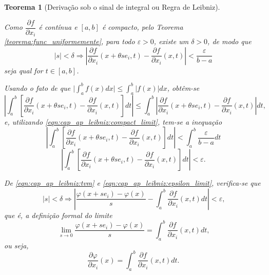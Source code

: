 \documentclass[
	12pt,				%
	openright,			%
    twoside,			%
	a4paper,			%
	chapter=TITLE,		%
	english,			%
	french,				%
	spanish,			%
	brazil				%
	]{abntex2}
\makeatletter
\newtheorem{teorema}{Teorema}
\renewenvironment{proof}[1][\proofname]{
	\par\pushQED{\qed}%
	\normalfont \topsep6\p@\@plus6\p@\relax
	\trivlist
	\item\relax
		{\itshape
			#1\@addpunct{.}}\hspace\labelsep\ignorespaces
}{%
	\popQED\endtrivlist\@endpefalse
}
\numberwithin{lema}{chapter}
\numberwithin{teorema}{chapter}
\numberwithin{definicao}{chapter}
\numberwithin{exemplo}{chapter}
\numberwithin{figure}{chapter}
\makeatother
\begin{document}
\begin{apendicesenv}
{\begin{teorema}[Derivação sob o sinal de integral ou Regra de Leibniz]
\begin{proof}
			Como $\dfrac{\partial f}{\partial x_i}$ é contínua e $[a,b]$ é compacto, pelo Teorema \ref{teorema:func_uniformemente}, para todo $\varepsilon > 0$, existe um $\delta > 0$, de modo que
			\begin{equation}
				\label{eqn:cap_ap_leibniz:compact_limit}
				|s|<\delta \Longrightarrow
				\left | 
					\frac{\partial f}{\partial x_i} (x+\theta s e_i, t) - \frac{\partial f}{\partial x_i}(x,t)
				\right | < \frac{\varepsilon}{b-a}
			\end{equation}
			seja qual for $t \in [a,b]$.
			
			Usando o fato de que $\displaystyle \Big |\int_a^b f(x)dx \Big | \leqslant \int_a^b |f(x)| dx$, obtêm-se
			$$
			\left |
				\int_a^b \left [
					\frac{\partial f}{\partial x_i}(x+\theta s e_i, t)-\frac{\partial f}{\partial x_i}(x,t)
				\right ] dt
			\right |
			\leqslant
			\int_a^b\left |
				\frac{\partial f}{\partial x_i}(x+\theta s e_i, t)-\frac{\partial f}{\partial x_i}(x,t)
			\right | dt\text{,}
			$$
			e, utilizando \eqref{eqn:cap_ap_leibniz:compact_limit}, tem-se a inequação
			$$
			\left |
				\int_a^b \left [
					\frac{\partial f}{\partial x_i}(x+\theta s e_i, t)-\frac{\partial f}{\partial x_i}(x,t)
				\right ] dt
			\right |
			<
			\int_a^b \frac{\varepsilon}{b-a} dt
			$$
			\begin{equation}
				\label{eqn:cap_ap_leibniz:epsilon_limit}
				\left |
					\int_a^b \left [
						\frac{\partial f}{\partial x_i}(x+\theta s e_i, t)-\frac{\partial f}{\partial x_i}(x,t)
					\right ] dt
				\right |
				< \varepsilon \text{.}
			\end{equation}
			
			De \eqref{eqn:cap_ap_leibniz:tvm} e \eqref{eqn:cap_ap_leibniz:epsilon_limit}, verifica-se que
			$$
				|s|<\delta \Longrightarrow
				\left |
					\frac{\varphi(x+se_i)-\varphi(x)}{s}
					- \int_a^b \frac{\partial f}{\partial x_i}(x,t) dt
				\right |
				< \varepsilon\text{,}
			$$
			que é, a definição formal do limite
			$$
				 \lim_{s\to 0} \frac{\varphi (x+se_i)-\varphi(x)}{s}= \int_a^b \frac{\partial f}{\partial x_i} (x, t)dt \text{,}
			$$
			ou seja,
			$$
				\frac{\partial \varphi}{\partial x_i}(x)=\int _a^b \frac{\partial f}{\partial x_i}(x,t)dt\text{.}
			$$
		\end{proof}
	\end{teorema}
	
}
\end{apendicesenv}
\end{document}
